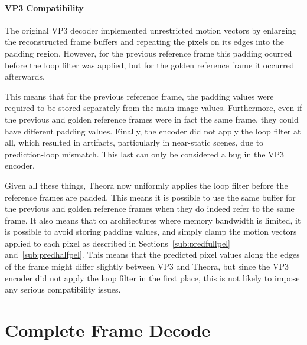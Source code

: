 \documentclass[9pt,letterpaper]{book}
\numberwithin{equation}{chapter}
\numberwithin{figure}{chapter}
\numberwithin{table}{chapter}
\begin{document}
\paragraph{VP3 Compatibility}

The original VP3 decoder implemented unrestricted motion vectors by enlarging
 the reconstructed frame buffers and repeating the pixels on its edges into the
 padding region.
However, for the previous reference frame this padding ocurred before the loop
 filter was applied, but for the golden reference frame it occurred afterwards.

This means that for the previous reference frame, the padding values were
 required to be stored separately from the main image values.
Furthermore, even if the previous and golden reference frames were in fact the
 same frame, they could have different padding values.
Finally, the encoder did not apply the loop filter at all, which resulted in
 artifacts, particularly in near-static scenes, due to prediction-loop
 mismatch.
This last can only be considered a bug in the VP3 encoder.

Given all these things, Theora now uniformly applies the loop filter before
 the reference frames are padded.
This means it is possible to use the same buffer for the previous and golden
 reference frames when they do indeed refer to the same frame.
It also means that on architectures where memory bandwidth is limited, it is
 possible to avoid storing padding values, and simply clamp the motion vectors
 applied to each pixel as described in Sections~\ref{sub:predfullpel}
 and~\ref{sub:predhalfpel}.
This means that the predicted pixel values along the edges of the frame might
 differ slightly between VP3 and Theora, but since the VP3 encoder did not
 apply the loop filter in the first place, this is not likely to impose any
 serious compatibility issues.

\section{Complete Frame Decode}
\end{document}
